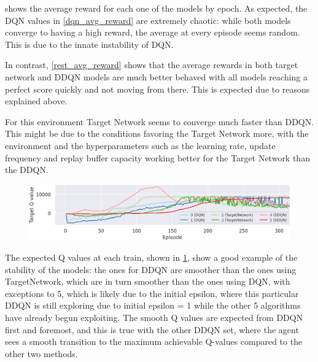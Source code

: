  shows the average reward for each one of the models by epoch.
As expected, the DQN values in \cref{dqn_avg_reward} are extremely chaotic: while both models converge to having a high reward, the average at every episode seems random.
This is due to the innate instability of DQN\cite{reinforcement_learning_introduction}.

In contrast, \cref{rest_avg_reward} shows that the average rewards in both target network and DDQN models are much better behaved with all models reaching a perfect score quickly and not moving from there. This is expected due to reasons explained above.

For this environment Target Network seems to converge much faster than DDQN. This might be due to the conditions favoring the Target Network more, with the environment and the hyperparameters such as the learning rate, update frequency and replay buffer capacity working better for the Target Network than the DDQN.





\begin{figure}[h]
	\includegraphics[width=\textwidth]{q_values.png}
	\label{q_values}
\end{figure}

The expected Q values at each train, shown in \cref{q_values}, show a good example of the stability of the models: the ones for DDQN are smoother than the ones using TargetNetwork, which are in turn smoother than the ones using DQN, with exceptions to \colorbox{id5}{5}, which is likely due to the initial epsilon, where this particular DDQN is still exploring due to initial epsilon = 1 while the other 5 algorithms have already begun exploiting. The smooth Q values are expected from DDQN first and foremost, and this is true with the other DDQN set, where the agent sees a smooth transition to the maximum achievable Q-values compared to the other two methods.

